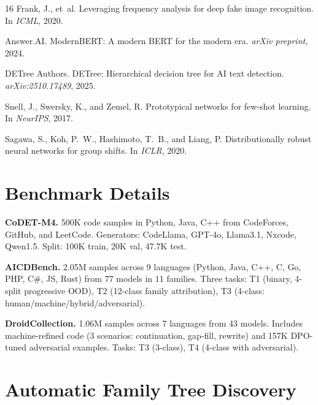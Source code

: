 \documentclass{article}
\begin{document}
\begin{thebibliography}{16}
Frank, J., et~al.
\newblock Leveraging frequency analysis for deep fake image recognition.
\newblock In \emph{ICML}, 2020.

Answer.AI.
\newblock ModernBERT: A modern BERT for the modern era.
\newblock \emph{arXiv preprint}, 2024.

DETree Authors.
\newblock DETree: Hierarchical decision tree for AI text detection.
\newblock \emph{arXiv:2510.17489}, 2025.

Snell, J., Swersky, K., and Zemel, R.
\newblock Prototypical networks for few-shot learning.
\newblock In \emph{NeurIPS}, 2017.

Sagawa, S., Koh, P.~W., Hashimoto, T.~B., and Liang, P.
\newblock Distributionally robust neural networks for group shifts.
\newblock In \emph{ICLR}, 2020.

\end{thebibliography}


\newpage
\appendix

\section{Benchmark Details}
\label{app:benchmarks}

\textbf{CoDET-M4.} 500K code samples in Python, Java, C++ from CodeForces, GitHub, and LeetCode. Generators: CodeLlama, GPT-4o, Llama3.1, Nxcode, Qwen1.5. Split: 100K train, 20K val, 47.7K test.

\textbf{AICDBench.} 2.05M samples across 9 languages (Python, Java, C++, C, Go, PHP, C\#, JS, Rust) from 77 models in 11 families. Three tasks: T1 (binary, 4-split progressive OOD), T2 (12-class family attribution), T3 (4-class: human/machine/hybrid/adversarial).

\textbf{DroidCollection.} 1.06M samples across 7 languages from 43 models. Includes machine-refined code (3 scenarios: continuation, gap-fill, rewrite) and 157K DPO-tuned adversarial examples. Tasks: T3 (3-class), T4 (4-class with adversarial).


\section{Automatic Family Tree Discovery}
\label{app:auto_tree}
\end{document}
